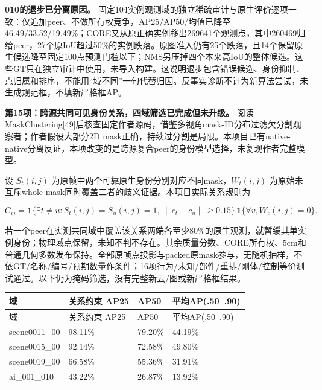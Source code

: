 \documentclass[UTF8,fontset=fandol]{ctexart}
\begin{document}
\textbf{010的退步已分离原因。} 固定104实例观测域的独立稀疏审计与原生评价逐项一致：仅追加peer、不做所有权竞争，AP25/AP50/均值已降至46.49/33.52/19.49\%；CORE又从原正确实例移出269641个观测点，其中260469归给peer，27个原IoU超过50\%的实例跌落。原图准入仍有25个跌落，且14个保留原生候选降至固定100点预测门槛以下；NMS另压掉四个本来高IoU的整体候选。这些GT只在独立审计中使用，未导入构建。这说明退步包含错误候选、身份抑制、点归属和排序，不能用“域不同”一句代替归因。反事实诊断不计为新算法尝试，未生成规范框，不填新严格框AP。



\textbf{第15项：跨源共同可见身份关系，四域筛选已完成但未升级。} 阅读MaskClustering[49]后核查固定作者源码，借鉴多视角mask-ID分布过滤欠分割观察者；作者假设大部分2D mask正确，持续过分割是局限。本项目已有native-native分离反证，本项改变的是跨源复合peer的身份模型选择，未复现作者完整模型。



设 $S_t(i,j)$ 为原帧中两个可靠原生身份分别对应不同mask，$W_t(i,j)$ 为原始未互斥whole mask同时覆盖二者的歧义证据。本项目实际关系规则为



\[
C_{ij}=\mathbf{1}\{\exists t\ne u:S_t(i,j)=S_u(i,j)=1,\ \|c_t-c_u\|\ge0.15\}\,\mathbf{1}\{\forall v, W_v(i,j)=0\}.
\]

若一个peer在实测共同域中覆盖该关系两端各至少80\%的原生观测，就暂缓其单实例身份；物理域点保留，未知不判不存在。其余质量分数、CORE所有权、5cm和普通几何多数发布保持。全部原帧点投影与packed原mask参与，无随机抽样，不依GT/名称/编号/预期数量作条件；16项行为/未知/部件/重排/刚体/控制等价测试通过。以下仍为掩码筛选，没有完整新云/图或新严格框结果。



{\small
\begin{longtable}{|p{}|p{}|p{}|p{}|}
\hline
域 & 关系约束 AP25 & AP50 & 平均AP(.50–.90) \\ \hline
\endfirsthead
\hline
域 & 关系约束 AP25 & AP50 & 平均AP(.50–.90) \\ \hline
\endhead
scene0011\_00 & 98.11\% & 79.20\% & 44.19\% \\ \hline
scene0015\_00 & 92.14\% & 72.58\% & 49.80\% \\ \hline
scene0019\_00 & 66.58\% & 55.36\% & 31.91\% \\ \hline
ai\_001\_010 & 43.22\% & 26.87\% & 13.92\% \\ \hline
\end{longtable}
}
\end{document}
